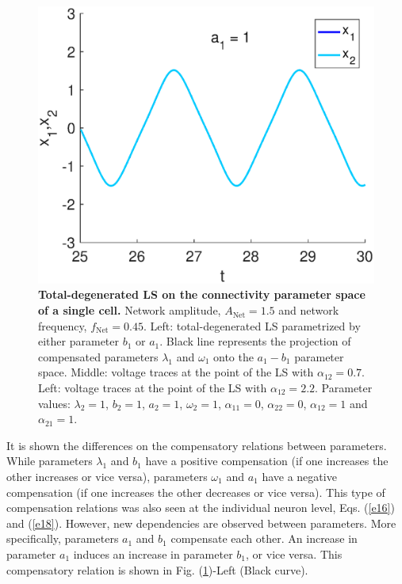 \begin{figure}[h]
\begin{minipage}{0.32\linewidth}
  \end{minipage} 
   \begin{minipage}{0.32\linewidth}
  \begin{center}
\includegraphics[width=1\linewidth]{Images/photo27_3.eps}
\end{center}

  \end{minipage} 
  
     \caption{\textbf{Total-degenerated LS on the connectivity parameter space of a single cell.} Network amplitude, $A_{\text{Net}} = 1.5$ and network frequency, $f_{\text{Net}} = 0.45$. Left: total-degenerated LS parametrized by either parameter $b_{1}$ or $a_{1}$. Black line represents the projection of compensated parameters $\lambda_{1}$ and $\omega_{1}$ onto the $a_{1}-b_{1}$ parameter space. Middle: voltage traces at the point of the LS with $\alpha_{12}=0.7$. Left: voltage traces at the point of the LS with $\alpha_{12}=2.2$. Parameter values: $\lambda_{2}=1$, $b_{2}=1$, $a_{2} = 1$, $\omega_{2} = 1$, $\alpha_{11}=0$, $\alpha_{22}=0$, $\alpha_{12}=1$ and $\alpha_{21}=1$.}
  \label{photo27}
\end{figure}

It is shown the differences on the compensatory relations between parameters. While parameters $\lambda_{1}$ and $b_{1}$ have a positive compensation (if one increases the other increases or vice versa), parameters $\omega_{1}$ and $a_{1}$ have a negative compensation (if one increases the other decreases or vice versa). This type of compensation relations was also seen at the individual neuron level, Eqs. (\ref{e16}) and (\ref{e18}). However, new dependencies are observed between parameters. More specifically, parameters $a_{1}$ and $b_{1}$ compensate each other. An increase in parameter $a_{1}$ induces an increase in parameter $b_{1}$, or vice versa. This compensatory relation is shown in Fig. (\ref{photo27})-Left (Black curve).

